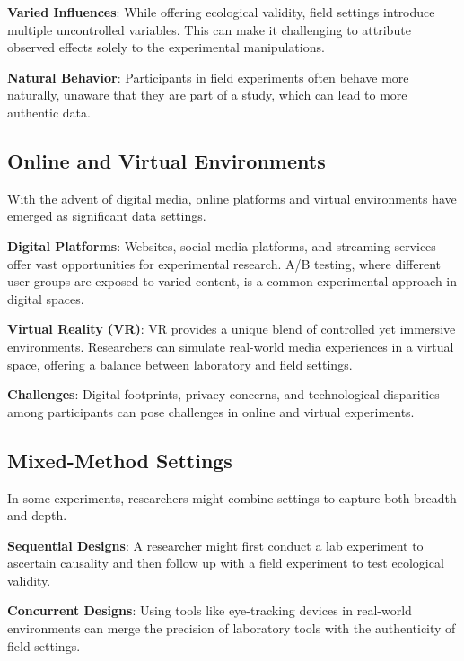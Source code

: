 \documentclass[
  b5paper]{book}
\begin{document}
\textbf{Varied Influences}: While offering ecological validity, field settings introduce multiple uncontrolled variables. This can make it challenging to attribute observed effects solely to the experimental manipulations.

\textbf{Natural Behavior}: Participants in field experiments often behave more naturally, unaware that they are part of a study, which can lead to more authentic data.

\hypertarget{online-and-virtual-environments}{%
\subsection*{Online and Virtual Environments}\label{online-and-virtual-environments}}

With the advent of digital media, online platforms and virtual environments have emerged as significant data settings.

\textbf{Digital Platforms}: Websites, social media platforms, and streaming services offer vast opportunities for experimental research. A/B testing, where different user groups are exposed to varied content, is a common experimental approach in digital spaces.

\textbf{Virtual Reality (VR)}: VR provides a unique blend of controlled yet immersive environments. Researchers can simulate real-world media experiences in a virtual space, offering a balance between laboratory and field settings.

\textbf{Challenges}: Digital footprints, privacy concerns, and technological disparities among participants can pose challenges in online and virtual experiments.

\hypertarget{mixed-method-settings}{%
\subsection*{Mixed-Method Settings}\label{mixed-method-settings}}

In some experiments, researchers might combine settings to capture both breadth and depth.

\textbf{Sequential Designs}: A researcher might first conduct a lab experiment to ascertain causality and then follow up with a field experiment to test ecological validity.

\textbf{Concurrent Designs}: Using tools like eye-tracking devices in real-world environments can merge the precision of laboratory tools with the authenticity of field settings.
\end{document}
